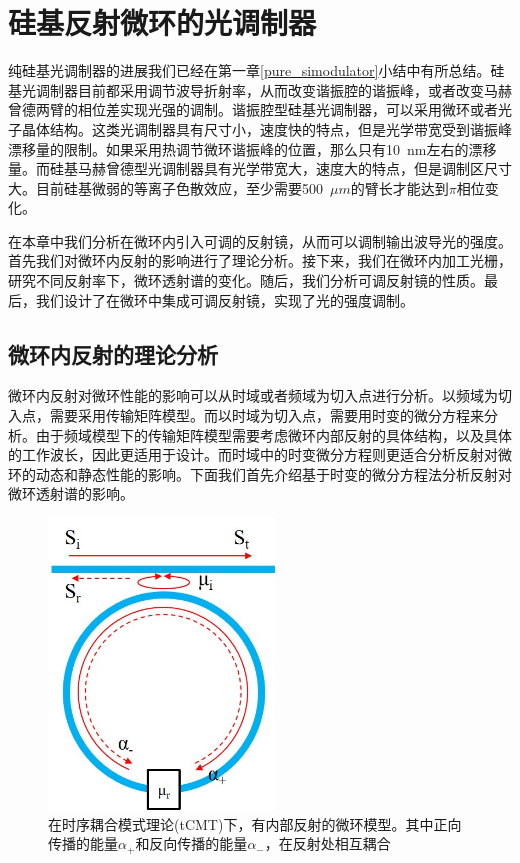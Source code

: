 \chapter{硅基反射微环的光调制器}
纯硅基光调制器的进展我们已经在第一章\ref{pure_simodulator}小结中有所总结。硅基光调制器目前都采用调节波导折射率，从而改变谐振腔的谐振峰，或者改变马赫曾德两臂的相位差实现光强的调制。谐振腔型硅基光调制器，可以采用微环或者光子晶体结构。这类光调制器具有尺寸小，速度快的特点，但是光学带宽受到谐振峰漂移量的限制。如果采用热调节微环谐振峰的位置，那么只有10~nm左右的漂移量。而硅基马赫曾德型光调制器具有光学带宽大，速度大的特点，但是调制区尺寸大。目前硅基微弱的等离子色散效应，至少需要500~$\mu m$的臂长才能达到$\pi$相位变化。

在本章中我们分析在微环内引入可调的反射镜，从而可以调制输出波导光的强度。首先我们对微环内反射的影响进行了理论分析。接下来，我们在微环内加工光栅，研究不同反射率下，微环透射谱的变化。随后，我们分析可调反射镜的性质。最后，我们设计了在微环中集成可调反射镜，实现了光的强度调制。
\section{微环内反射的理论分析}
微环内反射对微环性能的影响可以从时域或者频域为切入点进行分析。以频域为切入点，需要采用传输矩阵模型\cite{yariv2006photonics}。而以时域为切入点，需要用时变的微分方程来分析\cite{haus1984waves}。由于频域模型下的传输矩阵模型需要考虑微环内部反射的具体结构，以及具体的工作波长，因此更适用于设计。而时域中的时变微分方程则更适合分析反射对微环的动态和静态性能的影响。下面我们首先介绍基于时变的微分方程法分析反射对微环透射谱的影响\cite{haus1984waves,Li2016design,little1997microring}。
\begin{figure}[htb]
	\centering
	\includegraphics[width=6cm]{./Pictures/chapt5_ring_reflector_structure.jpg}
	\caption{在时序耦合模式理论(tCMT)下，有内部反射的微环模型。其中正向传播的能量$\alpha_+$和反向传播的能量$\alpha_-$，在反射处相互耦合}
	\label{chapt5_ring_reflector_structure}
\end{figure}

